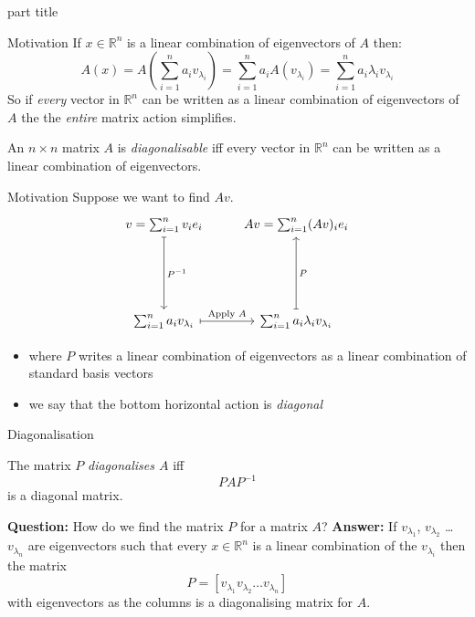 \documentclass{beamer}
\begin{document}
\begin{frame}
\begin{beamercolorbox}[sep=12pt,center]{part title}
\insertsection\par
\end{beamercolorbox}
\end{frame}

\begin{frame}{Motivation}
If $x\in \mathbb{R}^n$ is a linear combination of eigenvectors of $A$ then:
\begin{equation*}
	A(x) = A\left(\sum_{i=1}^n a_i v_{\lambda_i}\right) = \sum_{i=1}^n a_iA(v_{\lambda_i}) = \sum_{i=1}^n a_i\lambda_iv_{\lambda_i}
\end{equation*}
So if \emph{every} vector in $\mathbb{R}^n$ can be written as a linear combination of eigenvectors of $A$ the the \emph{entire} matrix action simplifies.\vfill
\begin{definition}
	An $n\times n$ matrix $A$ is \emph{diagonalisable} iff every vector in $\mathbb{R}^n$ can be written as a linear combination of eigenvectors.
\end{definition}
\end{frame}

\begin{frame}[fragile]{Motivation}
Suppose we want to find $Av$.
{\LARGE
\begin{equation*}
\begin{tikzcd}[row sep = 2cm]
v = \sum_{i=1}^n v_i e_i \dar[mapsto]{P^{-1}} & Av = \sum_{i=1}^n (Av)_i e_i\\
\sum_{i=1}^n a_i v_{\lambda_i} \rar[mapsto]{\text{Apply }A} & \sum_{i=1}^n a_i\lambda_i v_{\lambda_i} \uar[mapsto][swap]{P}
\end{tikzcd}
\end{equation*}
}
\begin{itemize}
	\item where $P$ writes a linear combination of eigenvectors as a linear combination of standard basis vectors
	\item we say that the bottom horizontal action is \emph{diagonal}
\end{itemize}
\end{frame}

\begin{frame}{Diagonalisation}
\begin{definition}
The matrix $P$ \emph{diagonalises $A$} iff 
\begin{equation*}
PAP^{-1}
\end{equation*}
is a diagonal matrix.
\end{definition}\vfill
{\bf Question:} How do we find the matrix $P$ for a matrix $A$?\vfill
{\bf Answer:} If $v_{\lambda_1}$, $v_{\lambda_2}$ \dots $v_{\lambda_n}$ are eigenvectors such that every $x\in \mathbb{R}^n$ is a linear combination of the $v_{\lambda_i}$ then the matrix
\begin{equation*}
P = \left[ v_{\lambda_1} v_{\lambda_2} \dots v_{\lambda_n}\right]
\end{equation*}
with eigenvectors as the columns is a diagonalising matrix for $A$.
\end{frame}
\end{document}
